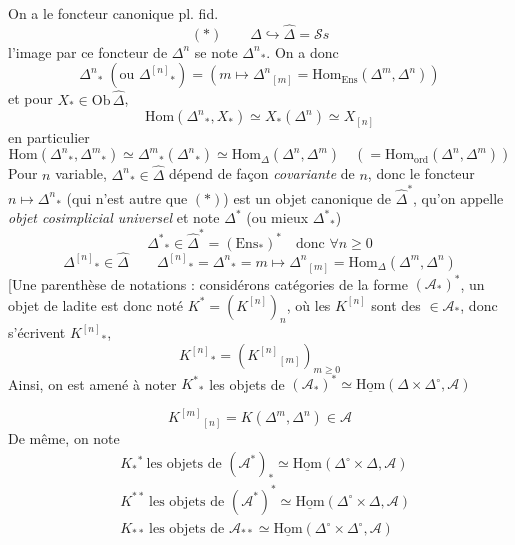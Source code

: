 \documentclass[11pt,a4paper]{article}
\begin{document}
On a le foncteur canonique pl. fid.
\[
  (*) \qquad \Delta \hookrightarrow \widehat{\Delta} = \mathcal{S}s
\]
l'image par ce foncteur de $\Delta^{n}$ se note  $\Delta^{n}{}_{*}$. On a donc
\[
  \Delta^{n}{}_{*} \;(\text{ou } \Delta^{[n]}{}_{*}) = (m \longmapsto \Delta^{n}{}_{[m]}
  = \mathrm{Hom}_{\mathrm{Ens}}(\Delta^{m}, \Delta^{n}))
\]
et pour $X_{*} \in \mathrm{Ob}\,\widehat{\Delta}$,
\[
  \mathrm{Hom}(\Delta^{n}{}_{*}, X_{*}) \simeq X_{*}(\Delta^{n}) \simeq X_{[n]}
\]
en particulier
\[
  \mathrm{Hom}(\Delta^{n}{}_{*}, \Delta^{m}{}_{*}) \simeq \Delta^{m}{}_{*}(\Delta^{n}{}_{*})
  \simeq \mathrm{Hom}_{\Delta}(\Delta^{n}, \Delta^{m})
  \quad (= \mathrm{Hom}_{\mathrm{ord}}(\Delta^{n}, \Delta^{m}))
\]
Pour $n$ variable, $\Delta^{n}{}_{*} \in \widehat{\Delta}$ dépend de façon
\emph{covariante} de $n$,  donc le foncteur $n \mapsto \Delta^{n}{}_{*}$
(qui n'est autre que $(*)$) est un objet canonique de $\widehat{\Delta}^{*}$, qu'on
appelle \emph{objet cosimplicial universel} et note $\Delta^{*}$ (ou mieux
$\Delta^{*}{}_{*}$)
\[
  \Delta^{*}{}_{*} \in \widehat{\Delta}^{*} = (\mathrm{Ens}_{*})^{*} \quad \text{donc } \forall n \geqslant 0
\]
\[
  \Delta^{[n]}{}_{*} \in \widehat{\Delta} \qquad
  \Delta^{[n]}{}_{*} = \Delta^{n}{}_{*} = m \longmapsto \Delta^{n}{}_{[m]}
  = \mathrm{Hom}_{\Delta}(\Delta^{m}, \Delta^{n})
\]
\struck{\ill{}}
[Une parenthèse de notations : considérons  catégories de la forme
$(\mathcal{A}_{*})^{*}$, un objet de ladite est donc noté
$K^{*} = (K^{[n]})_{n}$, où les $K^{[n]}$ sont des $\in \mathcal{A}_{*}$, donc
s'écrivent $K^{[n]}{}_{*}$,
\[
  K^{[n]}{}_{*} = (K^{[n]}{}_{[m]})_{m \geqslant 0}
\]
Ainsi, on est amené à noter $K^{*}{}_{*}$ les objets de
$(\mathcal{A}_{*})^{*} \simeq \underline{\mathrm{Hom}}(\Delta \times \Delta^{\circ}, \mathcal{A})$

\[
  K^{[m]}{}_{[n]} = K(\Delta^{m}, \Delta^{n}) \in \mathcal{A}
\]
De même, on note
\[
  \begin{aligned}
    &K_{*}{}^{*} \ \text{les objets de } (\mathcal{A}^{*})_{*} \simeq \underline{\mathrm{Hom}}(\Delta^{\circ} \times \Delta, \mathcal{A}) \\
    &K^{**} \ \text{les objets de } (\mathcal{A}^{*})^{*} \simeq \underline{\mathrm{Hom}}(\Delta^{\circ} \times \Delta, \mathcal{A}) \\
    &K_{**} \ \text{les objets de } \mathcal{A}_{**} \simeq \underline{\mathrm{Hom}}(\Delta^{\circ} \times \Delta^{\circ}, \mathcal{A})
  \end{aligned}
\]
\end{document}

